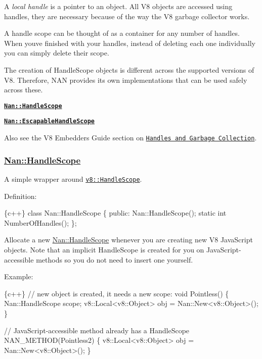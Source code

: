 A {\itshape local handle} is a pointer to an object. All V8 objects are accessed using handles, they are necessary because of the way the V8 garbage collector works.

A handle scope can be thought of as a container for any number of handles. When you\textquotesingle{}ve finished with your handles, instead of deleting each one individually you can simply delete their scope.

The creation of {\ttfamily Handle\+Scope} objects is different across the supported versions of V8. Therefore, N\+AN provides its own implementations that can be used safely across these.


\begin{DoxyItemize}
\item \href{#api_nan_handle_scope}{\tt {\bfseries {\ttfamily Nan\+::\+Handle\+Scope}}}
\item \href{#api_nan_escapable_handle_scope}{\tt {\bfseries {\ttfamily Nan\+::\+Escapable\+Handle\+Scope}}}
\end{DoxyItemize}

Also see the V8 Embedders Guide section on \href{https://developers.google.com/v8/embed#handles}{\tt Handles and Garbage Collection}.

\label{_api_nan_handle_scope}%
 \subsubsection*{\hyperlink{class_nan_1_1_handle_scope}{Nan\+::\+Handle\+Scope}}

A simple wrapper around \href{https://v8docs.nodesource.com/io.js-3.0/d3/d95/classv8_1_1_handle_scope.html}{\tt {\ttfamily v8\+::\+Handle\+Scope}}.

Definition\+:


\begin{DoxyCode}
\{c++\}
class Nan::HandleScope \{
 public:
  Nan::HandleScope();
  static int NumberOfHandles();
\};
\end{DoxyCode}


Allocate a new {\ttfamily \hyperlink{class_nan_1_1_handle_scope}{Nan\+::\+Handle\+Scope}} whenever you are creating new V8 Java\+Script objects. Note that an implicit {\ttfamily Handle\+Scope} is created for you on Java\+Script-\/accessible methods so you do not need to insert one yourself.

Example\+:


\begin{DoxyCode}
\{c++\}
// new object is created, it needs a new scope:
void Pointless() \{
  Nan::HandleScope scope;
  v8::Local<v8::Object> obj = Nan::New<v8::Object>();
\}

// JavaScript-accessible method already has a HandleScope
NAN\_METHOD(Pointless2) \{
  v8::Local<v8::Object> obj = Nan::New<v8::Object>();
\}
\end{DoxyCode}


